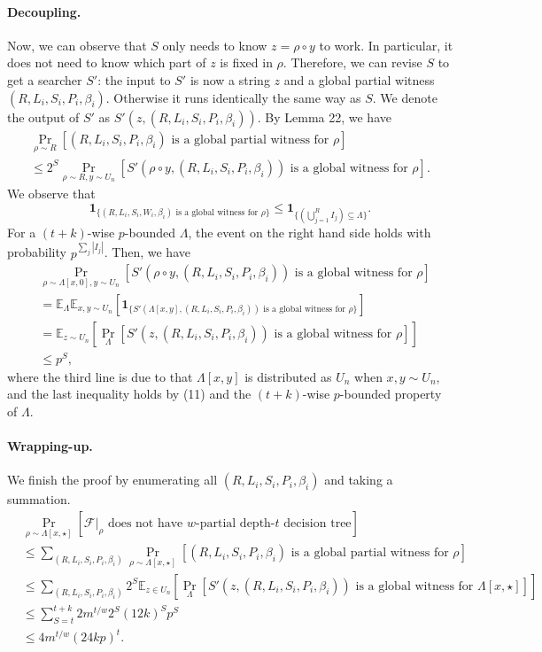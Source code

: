 \paragraph{Decoupling.} Now, we can observe that $S$ only needs to know $z=\rho\circ y$ to work. In particular, it does not need to know which part of $z$ is fixed in $\rho$. Therefore, we can revise $S$ to get a searcher $S'$: the input to $S'$ is now a string $z$ and a global partial witness $(R,L_i,S_i,P_i,\beta_i)$. Otherwise it runs identically the same way as $S$. We denote the output of $S'$ as $S'(z,(R,L_i,S_i,P_i,\beta_i))$. By Lemma 22, we have
\begin{multline*}\Pr_{\rho\sim R}[(R,L_i,S_i,P_i,\beta_i)\text{ is a global partial witness for }\rho]\\\le2^S\Pr_{\rho\sim R,y\sim U_n}[S'(\rho\circ y,(R,L_i,S_i,P_i,\beta_i))\text{ is a global witness for }\rho].\end{multline*}
We observe that
\[\mathbf1_{\{(R,L_i,S_i,W_i,\beta_i)\text{ is a global witness for }\rho\}}\le\mathbf1_{\{(\bigcup_{j=1}^RI_j)\subseteq\Lambda\}}.\tag{11}\]
For a $(t+k)$-wise $p$-bounded $\Lambda$, the event on the right hand side holds with probability $p^{\sum_j|I_j|}$. Then, we have
\begin{align*}&\Pr_{\rho\sim\Lambda[x,0],y\sim U_n}[S'(\rho\circ y,(R,L_i,S_i,P_i,\beta_i))\text{ is a global witness for }\rho]\\&=\mathbb E_\Lambda\mathbb E_{x,y\sim U_n}[\mathbf1_{\{S'(\Lambda[x,y],(R,L_i,S_i,P_i,\beta_i))\text{ is a global witness for }\rho\}}]\\&=\mathbb E_{z\sim U_n}\left[\Pr_\Lambda[S'(z,(R,L_i,S_i,P_i,\beta_i))\text{ is a global witness for }\rho]\right]\\&\le p^S,\end{align*}
where the third line is due to that $\Lambda[x,y]$ is distributed as $U_n$ when $x,y\sim U_n$, and the last inequality holds by (11) and the $(t+k)$-wise $p$-bounded property of $\Lambda$.
\paragraph{Wrapping-up.} We finish the proof by enumerating all $(R,L_i,S_i,P_i,\beta_i)$ and taking a summation.
\begin{align*}&\Pr_{\rho\sim\Lambda[x,\star]}[\mathcal F|_\rho\text{ does not have }w\text{-partial depth-}t\text{ decision tree}]\\&\le\sum_{(R,L_i,S_i,P_i,\beta_i)}\Pr_{\rho\sim\Lambda[x,\star]}[(R,L_i,S_i,P_i,\beta_i)\text{ is a global partial witness for }\rho]\\&\le\sum_{(R,L_i,S_i,P_i,\beta_i)}2^S\mathbb E_{z\in U_n}\left[\Pr_\Lambda[S'(z,(R,L_i,S_i,P_i,\beta_i))\text{ is a global witness for }\Lambda[x,\star]]\right]\\&\le\sum_{S=t}^{t+k}2m^{t/w}2^S(12k)^Sp^S\\&\le4m^{t/w}(24kp)^t.\tag{12}\end{align*}
